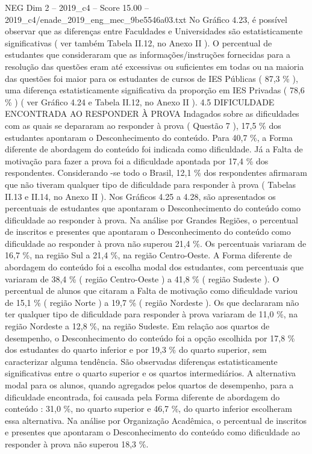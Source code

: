 \begin{textsample}{NEG Dim 2 – 2019\_c4 – Score 15.00 – 2019\_c4/enade\_2019\_eng\_mec\_9be5546a03.txt}
No Gráfico 4.23, é possível observar que as diferenças entre Faculdades e Universidades são estatisticamente significativas ( ver também Tabela II.12, no Anexo II ).
O percentual de estudantes que consideraram que as informações/instruções fornecidas para a resolução das questões eram até excessivas ou suficientes em todas ou na maioria das questões foi maior para os estudantes de cursos de IES Públicas ( 87,3 \% ), uma diferença estatisticamente significativa da proporção em IES Privadas ( 78,6 \% ) ( ver Gráfico 4.24 e Tabela II.12, no Anexo II ). 4.5 DIFICULDADE ENCONTRADA AO RESPONDER À PROVA Indagados sobre as dificuldades com as quais se depararam ao responder à prova ( Questão 7 ), 17,5 \% dos estudantes apontaram o Desconhecimento do conteúdo.
Para 40,7 \%, a Forma diferente de abordagem do conteúdo foi indicada como dificuldade.
Já a Falta de motivação para fazer a prova foi a dificuldade apontada por 17,4 \% dos respondentes.
Considerando -se todo o Brasil, 12,1 \% dos respondentes afirmaram que não tiveram qualquer tipo de dificuldade para responder à prova ( Tabelas II.13 e II.14, no Anexo II ).
Nos Gráficos 4.25 a 4.28, são apresentados os percentuais de estudantes que apontaram o Desconhecimento do conteúdo como dificuldade ao responder à prova.
Na análise por Grandes Regiões, o percentual de inscritos e presentes que apontaram o Desconhecimento do conteúdo como dificuldade ao responder à prova não superou 21,4 \%.
Os percentuais variaram de 16,7 \%, na região Sul a 21,4 \%, na região Centro-Oeste.
A Forma diferente de abordagem do conteúdo foi a escolha modal dos estudantes, com percentuais que variaram de 38,4 \% ( região Centro-Oeste ) a 41,8 \% ( região Sudeste ).
O percentual de alunos que citaram a Falta de motivação como dificuldade variou de 15,1 \% ( região Norte ) a 19,7 \% ( região Nordeste ).
Os que declararam não ter qualquer tipo de dificuldade para responder à prova variaram de 11,0 \%, na região Nordeste a 12,8 \%, na região Sudeste.
Em relação aos quartos de desempenho, o Desconhecimento do conteúdo foi a opção escolhida por 17,8 \% dos estudantes do quarto inferior e por 19,3 \% do quarto superior, sem caracterizar alguma tendência.
São observadas diferenças estatisticamente significativas entre o quarto superior e os quartos intermediários.
A alternativa modal para os alunos, quando agregados pelos quartos de desempenho, para a dificuldade encontrada, foi causada pela Forma diferente de abordagem do conteúdo : 31,0 \%, no quarto superior e 46,7 \%, do quarto inferior escolheram essa alternativa.
Na análise por Organização Acadêmica, o percentual de inscritos e presentes que apontaram o Desconhecimento do conteúdo como dificuldade ao responder à prova não superou 18,3 \%.

\end{textsample}
